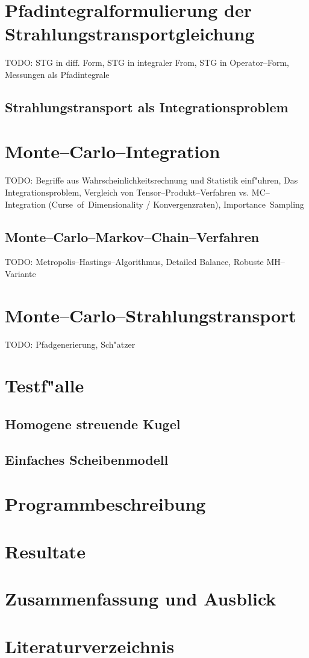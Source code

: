 \documentclass[11pt,a4paper,DIVcalc,BCOR8mm,titlepage,twoside]{scrartcl}
\begin{document}
	\section{Pfadintegralformulierung der Strahlungstransportgleichung}
	TODO: STG in diff. Form, STG in integraler From, STG in Operator--Form, Messungen als Pfadintegrale
	\subsection{Strahlungstransport als Integrationsproblem}
	\section{Monte--Carlo--Integration}
	TODO: Begriffe aus Wahrscheinlichkeitsrechnung und Statistik einf"uhren, Das Integrationsproblem, Vergleich von Tensor--Produkt--Verfahren vs. MC--Integration (Curse~of~Dimensionality / Konvergenzraten), Importance~Sampling

	\subsection{Monte--Carlo--Markov--Chain--Verfahren}
	TODO: Metropolis--Hastings--Algorithmus, Detailed Balance, Robuste MH--Variante

	\section{Monte--Carlo--Strahlungstransport}
	TODO: Pfadgenerierung, Sch"atzer
	
	\section{Testf"alle}
	\subsection{Homogene streuende Kugel}
	\subsection{Einfaches Scheibenmodell}
	
	\section{Programmbeschreibung}
	\section{Resultate}
	\section{Zusammenfassung und Ausblick}
	\section{Literaturverzeichnis}
\end{document}
